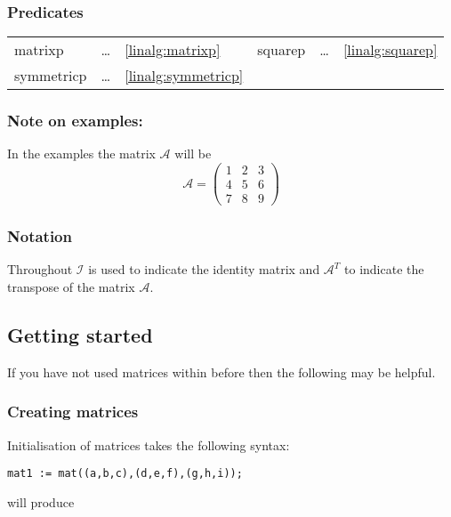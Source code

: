 \subsubsection{Predicates}

\begin{center}
  \begin{tabular}{l l l l l l}
    matrixp     & \ldots &\ref{linalg:matrixp} & 
    squarep     & \ldots &\ref{linalg:squarep} \\
    symmetricp  & \ldots &\ref{linalg:symmetricp} & 
  \end{tabular}
\end{center}


\subsubsection*{Note on examples:} 

In the examples the matrix $\mathcal{A}$ will be 
\begin{displaymath}
\mathcal{A} = \begin{pmatrix} 1 & 2 & 3 \\ 4 & 5 & 6 \\ 7 & 8 & 9 \end{pmatrix}
\end{displaymath}


\subsubsection*{Notation}

Throughout $\mathcal{I}$ is used to indicate the identity matrix and 
$\mathcal{A}^T$ to indicate the transpose of the matrix $\mathcal{A}$.

\subsection{Getting started}

If you have not used matrices within {\REDUCE} before then the following may be
helpful.

\subsubsection*{Creating matrices}

Initialisation of matrices takes the following syntax:

{\tt mat1 := mat((a,b,c),(d,e,f),(g,h,i));}

will produce 

